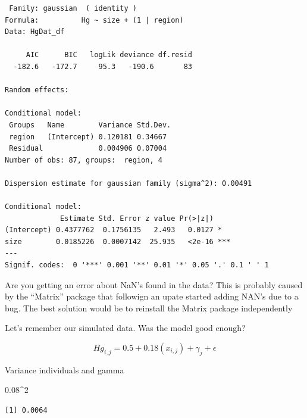 \documentclass[
  letterpaper,
  DIV=11,
  numbers=noendperiod]{scrartcl}
\newenvironment{Shaded}{\begin{snugshade}}{\end{snugshade}}
\newcommand{\DecValTok}[1]{\textcolor[rgb]{0.68,0.00,0.00}{#1}}
\newcommand{\FloatTok}[1]{\textcolor[rgb]{0.68,0.00,0.00}{#1}}
\newcommand{\SpecialCharTok}[1]{\textcolor[rgb]{0.37,0.37,0.37}{#1}}
\begin{document}
\begin{verbatim}
 Family: gaussian  ( identity )
Formula:          Hg ~ size + (1 | region)
Data: HgDat_df

     AIC      BIC   logLik deviance df.resid 
  -182.6   -172.7     95.3   -190.6       83 

Random effects:

Conditional model:
 Groups   Name        Variance Std.Dev.
 region   (Intercept) 0.120181 0.34667 
 Residual             0.004906 0.07004 
Number of obs: 87, groups:  region, 4

Dispersion estimate for gaussian family (sigma^2): 0.00491 

Conditional model:
             Estimate Std. Error z value Pr(>|z|)    
(Intercept) 0.4377762  0.1756135   2.493   0.0127 *  
size        0.0185226  0.0007142  25.935   <2e-16 ***
---
Signif. codes:  0 '***' 0.001 '**' 0.01 '*' 0.05 '.' 0.1 ' ' 1
\end{verbatim}

\begin{tcolorbox}[enhanced jigsaw, title=\textcolor{quarto-callout-note-color}{\faInfo}\hspace{0.5em}{Note}, rightrule=.15mm, breakable, colbacktitle=quarto-callout-note-color!10!white, leftrule=.75mm, colback=white, bottomrule=.15mm, toprule=.15mm, opacitybacktitle=0.6, colframe=quarto-callout-note-color-frame, left=2mm, coltitle=black, opacityback=0, bottomtitle=1mm, toptitle=1mm, titlerule=0mm, arc=.35mm]

Are you getting an error about NaN's found in the data? This is probably
caused by the ``Matrix'' package that followign an upate started adding
NAN's due to a bug. The best solution would be to reinstall the Matrix
package independently

\end{tcolorbox}

Let's remember our simulated data. Was the model good enough?

\[
Hg_{i,j} = 0.5+0.18(x_{i,j}) + \gamma_j + \epsilon
\]

Variance individuals and gamma

\begin{Shaded}
\begin{Highlighting}[]
\FloatTok{0.08}\SpecialCharTok{\^{}}\DecValTok{2}
\end{Highlighting}
\end{Shaded}

\begin{verbatim}
[1] 0.0064
\end{verbatim}
\end{document}
